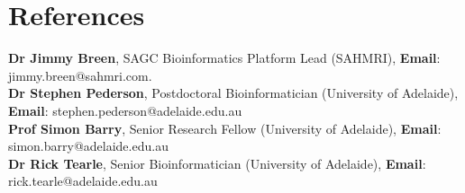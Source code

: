 \documentclass[]{deedy-resume-openfont}
\begin{document}
\section{References}
\textbf{Dr Jimmy Breen}, SAGC Bioinformatics Platform Lead (SAHMRI), \textbf{Email}: jimmy.breen@sahmri.com.\\
\textbf{Dr Stephen Pederson}, Postdoctoral Bioinformatician (University of Adelaide), \textbf{Email}: stephen.pederson@adelaide.edu.au\\
\textbf{Prof Simon Barry}, Senior Research Fellow (University of Adelaide), \textbf{Email}: simon.barry@adelaide.edu.au\\
\textbf{Dr Rick Tearle}, Senior Bioinformatician (University of Adelaide), \textbf{Email}: rick.tearle@adelaide.edu.au\\
\end{document}
